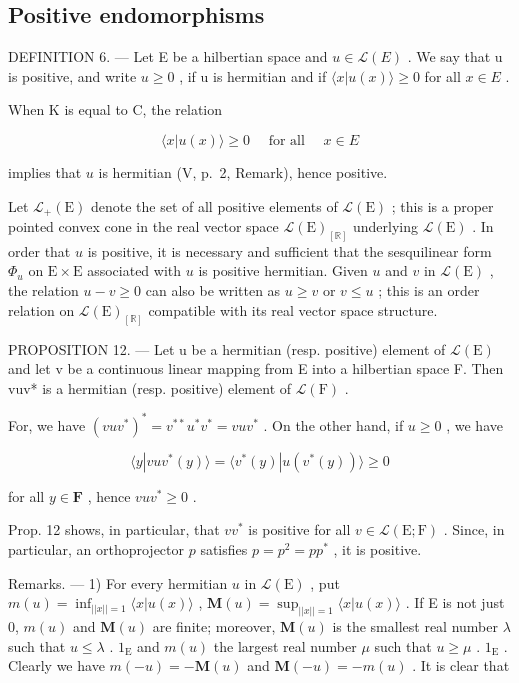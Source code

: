 \subsection{Positive endomorphisms}

DEFINITION 6. --- Let E be a hilbertian space and \(u \in \mathcal{L}(E)\) . We say that u is positive, and write \(u \geqslant 0\) , if u is hermitian and if \(\langle x|u(x) \rangle \geqslant 0\) for all \(x \in E\) .

When K is equal to C, the relation

\[
\langle x | u (x) \rangle \geqslant 0 \quad \text { for   all } \quad x \in E
\]

implies that \(u\) is hermitian (V, p.~2, Remark), hence positive.

Let \(\mathcal{L}_{+}(\mathrm{E})\) denote the set of all positive elements of \(\mathcal{L}(\mathrm{E})\) ; this is a proper pointed convex cone in the real vector space \(\mathcal{L}(\mathrm{E})_{[\mathbb{R}]}\) underlying \(\mathcal{L}(\mathrm{E})\) . In order that \(u\) is positive, it is necessary and sufficient that the sesquilinear form \(\Phi_u\) on \(\mathrm{E} \times \mathrm{E}\) associated with \(u\) is positive hermitian. Given \(u\) and \(v\) in \(\mathcal{L}(\mathrm{E})\) , the relation \(u - v \geqslant 0\) can also be written as \(u \geqslant v\) or \(v \leqslant u\) ; this is an order relation on \(\mathcal{L}(\mathrm{E})_{[\mathbb{R}]}\) compatible with its real vector space structure.

PROPOSITION 12. --- Let u be a hermitian (resp. positive) element of \(\mathcal{L}(\mathrm{E})\) and let v be a continuous linear mapping from E into a hilbertian space F. Then vuv* is a hermitian (resp. positive) element of \(\mathcal{L}(\mathrm{F})\) .

For, we have \((vuv^{*})^{*} = v^{**}u^{*}v^{*} = vuv^{*}\) . On the other hand, if \(u \geqslant 0\) , we have

\[
\langle y | v u v ^ {*} (y) \rangle = \langle v ^ {*} (y) | u (v ^ {*} (y)) \rangle \geqslant 0
\]

for all \(y \in \mathbf{F}\) , hence \(vuv^{*} \geqslant 0\) .

Prop. 12 shows, in particular, that \(vv^*\) is positive for all \(v \in \mathcal{L}(\mathrm{E};\mathrm{F})\) . Since, in particular, an orthoprojector \(p\) satisfies \(p = p^2 = pp^*\) , it is positive.

Remarks. --- 1) For every hermitian \(u\) in \(\mathcal{L}(\mathrm{E})\) , put \(m(u) = \inf_{||x|| = 1} \langle x|u(x) \rangle\) , \(\mathbf{M}(u) = \sup_{||x|| = 1} \langle x|u(x) \rangle\) . If E is not just 0, \(m(u)\) and \(\mathbf{M}(u)\) are finite; moreover, \(\mathbf{M}(u)\) is the smallest real number \(\lambda\) such that \(u \leqslant \lambda\) . \(1_{\mathrm{E}}\) and \(m(u)\) the largest real number \(\mu\) such that \(u \geqslant \mu\) . \(1_{\mathrm{E}}\) . Clearly we have \(m(-u) = -\mathbf{M}(u)\) and \(\mathbf{M}(-u) = -m(u)\) . It is clear that

